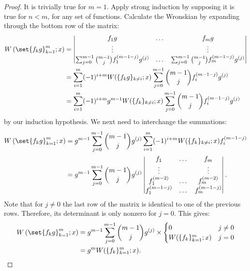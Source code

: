 \documentclass{article}
\begin{document}
\begin{proof}
It is trivially true for $m=1$.
Apply strong induction by supposing it is true for $n<m$, for any set of functions.
Calculate the Wronskian by expanding through the bottom row of the matrix:
\begin{equation*}
\begin{split}
\W{\set{f_k g}_{k=1}^m}{x}
& = \begin{vmatrix}
f_1 g & \dots & f_m g \\
\vdots & & \vdots \\
\sum_{j=0}^{m-1} \binom{m-1}{j} f_1^{(m-1-j)} g^{(j)}
& \dots & \sum_{j=0}^{m-1} \binom{m-1}{j} f_m^{(m-1-j)} g^{(j)}
\end{vmatrix} \\
& = \sum_{i=1}^m (-1)^{i+m} W(\{f_k g\}_{k \neq i} ; x) \sum_{j=0}^{m-1} \binom{m-1}{j} f_i^{(m-1-j)} g^{(j)} \\
& = \sum_{i=1}^m (-1)^{i+m} g^{m-1} W(\{ f_k \}_{k \neq i} ; x) \sum_{j=0}^{m-1} \binom{m-1}{j} f_i^{(m-1-j)} g^{(j)}
\end{split}
\end{equation*}
by our induction hypothesis.
We next need to interchange the summations:
\begin{equation*}
\begin{split}
\W{\set{f_k g}_{k=1}^m}{x}
& = g^{m-1} \sum_{j=0}^{m-1} \binom{m-1}{j} g^{(j)}
\sum_{i=1}^m (-1)^{i+m} W(\{f_k\}_{k\neq i} ; x) f_i^{(m-1-j)} \\
& = g^{m-1} \sum_{j=0}^{m-1} \binom{m-1}{j} g^{(j)}
\begin{vmatrix} f_1 & \dots & f_m \\
\vdots & & \vdots \\
f_1^{(m-2)} & \dots & f_m^{(m-2)} \\
f_1^{(m-1-j)} & \dots & f_m^{(m-1-j)} \end{vmatrix} .
\end{split}
\end{equation*}
Note that for $j \neq 0$ the last row of the matrix is identical to one of the previous rows.
Therefore, its determinant is only nonzero for $j = 0$.
This gives:
\begin{equation*}
\begin{split}
\W{\set{f_k g}_{k=1}^m}{x}
& = g^{m-1} \sum_{j=0}^{m-1} \binom{m-1}{j} g^{(j)} \times \begin{cases} 0 & j\neq 0 \\
W(\{f_k\}_{k=1}^m ; x) & j = 0 \end{cases} \\
& = g^m W(\{f_k\}_{k=1}^m ; x) .
\end{split}
\end{equation*}
\end{proof}
\end{document}
